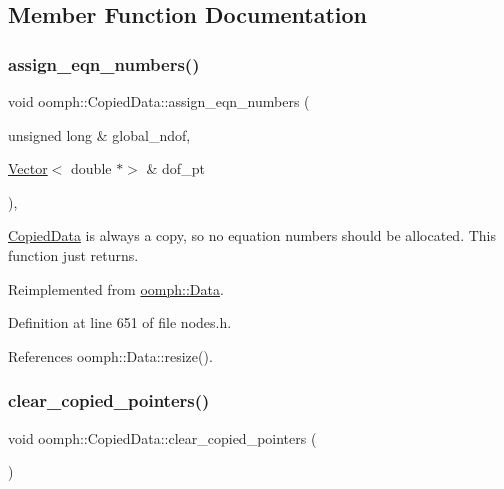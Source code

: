 \subsection{Member Function Documentation}
\mbox{\label{classoomph_1_1CopiedData_a41e228dd49d078dd35520992d57f0f5f}} 
\subsubsection{\texorpdfstring{assign\+\_\+eqn\+\_\+numbers()}{assign\_eqn\_numbers()}}
{\footnotesize\ttfamily void oomph\+::\+Copied\+Data\+::assign\+\_\+eqn\+\_\+numbers (\begin{DoxyParamCaption}\item[{unsigned long \&}]{global\+\_\+ndof,  }\item[{\hyperlink{classoomph_1_1Vector}{Vector}$<$ double $\ast$$>$ \&}]{dof\+\_\+pt }\end{DoxyParamCaption})\hspace{0.3cm}{\ttfamily [inline]}, {\ttfamily [virtual]}}



\hyperlink{classoomph_1_1CopiedData}{Copied\+Data} is always a copy, so no equation numbers should be allocated. This function just returns. 



Reimplemented from \hyperlink{classoomph_1_1Data_a7b26834562644d212f8bb5c7ed482c61}{oomph\+::\+Data}.



Definition at line 651 of file nodes.\+h.



References oomph\+::\+Data\+::resize().

\mbox{\label{classoomph_1_1CopiedData_a675b1811d9c6b1ba1ce4bbcb7b681245}} 
\subsubsection{\texorpdfstring{clear\+\_\+copied\+\_\+pointers()}{clear\_copied\_pointers()}}
{\footnotesize\ttfamily void oomph\+::\+Copied\+Data\+::clear\+\_\+copied\+\_\+pointers (\begin{DoxyParamCaption}{ }\end{DoxyParamCaption})\hspace{0.3cm}{\ttfamily [virtual]}}



